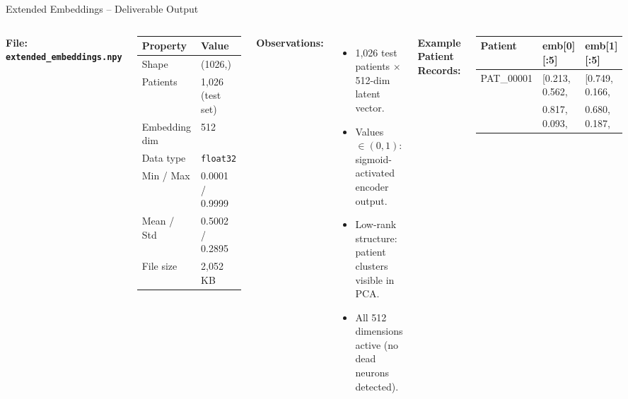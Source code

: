 \documentclass[aspectratio=169]{beamer}
\begin{document}
\begin{frame}[fragile]{Extended Embeddings -- Deliverable Output}
  \begin{columns}[T]
      \textbf{File: \texttt{extended\_embeddings.npy}}
      \begin{center}\small
      \begin{tabular}{@{}ll@{}}
        \toprule
        \textbf{Property} & \textbf{Value} \\
        \midrule
        Shape         & (1026,\;512) \\
        Patients      & 1,026 (test set) \\
        Embedding dim & 512 \\
        Data type     & \texttt{float32} \\
        Min / Max     & 0.0001 / 0.9999 \\
        Mean / Std    & 0.5002 / 0.2895 \\
        File size     & 2,052 KB \\
        \bottomrule
      \end{tabular}
      \end{center}
      \vspace{0.2em}
      \textbf{Observations:}
      \begin{itemize}\scriptsize
        \item 1,026 test patients $\times$ 512-dim latent vector.
        \item Values $\in(0,1)$: sigmoid-activated encoder output.
        \item Low-rank structure: patient clusters visible in PCA.
        \item All 512 dimensions active (no dead neurons detected).
      \end{itemize}
      \textbf{Example Patient Records:}
      \begin{center}\scriptsize
      \begin{tabular}{@{}lll@{}}
        \toprule
        \textbf{Patient} & \textbf{emb[0][:5]} & \textbf{emb[1][:5]} \\
        \midrule
        PAT\_00001 & [0.213, 0.562, & [0.749, 0.166, \\
                   &  0.817, 0.093,  &  0.680, 0.187, \\

\end{tabular}
\end{center}
\end{columns}
\end{frame}
\end{document}
